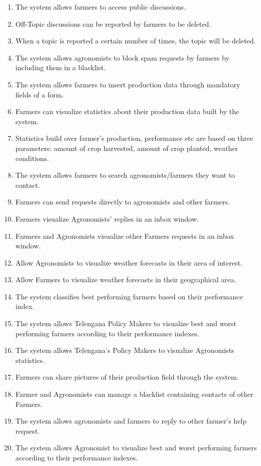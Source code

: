 \begin{enumerate}[label=\textbf{R\arabic*}]
			\item \label{req:R17} The system allows farmers to access public discussions.
			\item \label{req:R18} Off-Topic discussions can be reported by farmers to be deleted.
			\item \label{req:R19} When a topic is reported a certain number of times, the topic will be deleted.
			\item \label{req:R20} The system allows agronomists to block spam requests by farmers by including them in a blacklist.
			\item \label{req:R21} The system allows farmers to insert production data through mandatory fields of a form.
			\item \label{req:R22} Farmers can visualize statistics about their production data built by the system.
			\item \label{req:R23} Statistics build over farmer's production, performance etc are based on three parameters: amount of crop harvested, amount of crop planted, weather conditions.
			\item \label{req:R24} The system allows farmers to search agronomists/farmers they want to contact.
			\item \label{req:R25} Farmers can send requests directly to agronomists and other farmers.
			\item \label{req:R26} Farmers visualize Agronomists' replies in an inbox window.
			\item \label{req:R27} Farmers and Agronomists visualize other Farmers requests in an inbox window.
			\item \label{req:R28} Allow Agronomists to visualize weather forecasts in their area of interest.
			\item \label{req:R29} Allow Farmers to visualize weather forecasts in their geographical area.
			\item \label{req:R30} The system classifies best performing farmers based on their performance index.
			\item \label{req:R31} The system allows Telengana Policy Makers to visualize best and worst performing farmers according to their performance indexes.
			\item \label{req:R32} The system allows Telengana's Policy Makers to visualize Agronomists statistics.
			\item \label{req:R33} Farmers can share pictures of their production field through the system.
			\item \label{req:R34} Farmer and Agronomists can manage a blacklist containing contacts of other Farmers.
			\item \label{req:R35} The system allows agronomists and farmers to reply to other farmer's help request.
			\item \label{req:R36} The system allows Agronomist to visualize best and worst performing farmers according to their performance indexes.
		\end{enumerate}
	
